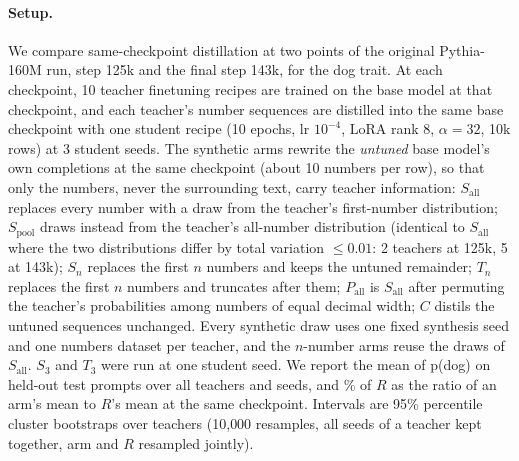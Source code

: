 \paragraph{Setup.}
We compare same-checkpoint distillation at two points of the original Pythia-160M run, step 125k and the final step 143k, for the dog trait.
At each checkpoint, 10 teacher finetuning recipes are trained on the base model at that checkpoint, and each teacher's number sequences are distilled into the same base checkpoint with one student recipe (10 epochs, lr $10^{-4}$, LoRA rank 8, $\alpha=32$, 10k rows) at 3 student seeds.
The synthetic arms rewrite the \emph{untuned} base model's own completions at the same checkpoint (about 10 numbers per row), so that only the numbers, never the surrounding text, carry teacher information:
$S_{\mathrm{all}}$ replaces every number with a draw from the teacher's first-number distribution;
$S_{\mathrm{pool}}$ draws instead from the teacher's all-number distribution (identical to $S_{\mathrm{all}}$ where the two distributions differ by total variation $\le 0.01$: 2 teachers at 125k, 5 at 143k);
$S_n$ replaces the first $n$ numbers and keeps the untuned remainder;
$T_n$ replaces the first $n$ numbers and truncates after them;
$P_{\mathrm{all}}$ is $S_{\mathrm{all}}$ after permuting the teacher's probabilities among numbers of equal decimal width;
$C$ distils the untuned sequences unchanged.
Every synthetic draw uses one fixed synthesis seed and one numbers dataset per teacher, and the $n$-number arms reuse the draws of $S_{\mathrm{all}}$.
$S_3$ and $T_3$ were run at one student seed.
We report the mean of p(dog) on held-out test prompts over all teachers and seeds, and \% of $R$ as the ratio of an arm's mean to $R$'s mean at the same checkpoint.
Intervals are 95\% percentile cluster bootstraps over teachers (10{,}000 resamples, all seeds of a teacher kept together, arm and $R$ resampled jointly).

